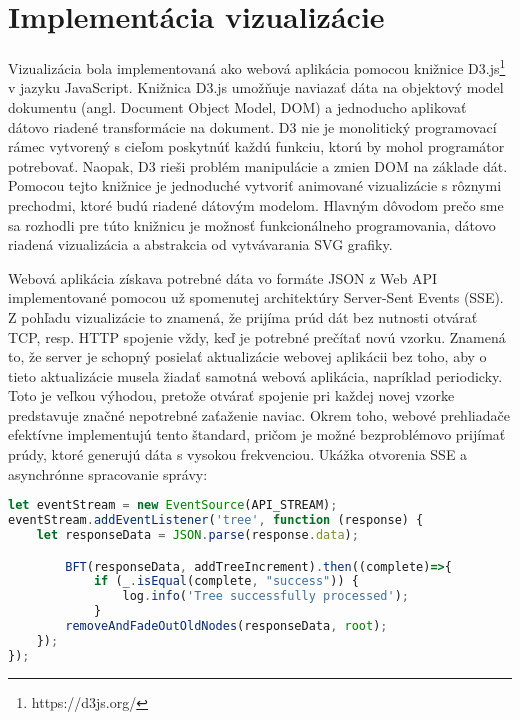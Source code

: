 \section{Implementácia vizualizácie}
\label{Implementácia vizualizácie}
Vizualizácia bola implementovaná ako webová aplikácia pomocou knižnice D3.js\footnote{https://d3js.org/} v jazyku JavaScript. Knižnica D3.js umožňuje naviazať dáta na objektový model dokumentu (angl. Document Object Model, DOM) a jednoducho aplikovať dátovo riadené transformácie na dokument. D3 nie je monolitický programovací rámec vytvorený s cieľom poskytnúť každú funkciu, ktorú by mohol programátor potrebovať. Naopak, D3 rieši problém manipulácie a zmien DOM na základe dát. Pomocou tejto knižnice je jednoduché vytvoriť animované vizualizácie s rôznymi prechodmi, ktoré budú riadené dátovým modelom. Hlavným dôvodom prečo sme sa rozhodli pre túto knižnicu je možnosť funkcionálneho programovania, dátovo riadená vizualizácia a abstrakcia od vytvávarania SVG grafiky.
\par
Webová aplikácia získava potrebné dáta vo formáte JSON z Web API implementované pomocou už spomenutej architektúry Server-Sent Events (SSE). Z pohľadu vizualizácie to znamená, že prijíma prúd dát bez nutnosti otvárať TCP, resp. HTTP spojenie vždy, keď je potrebné prečítať novú vzorku. Znamená to, že server je schopný posielať aktualizácie webovej aplikácii bez toho, aby o tieto aktualizácie musela žiadať samotná webová aplikácia, napríklad periodicky. Toto je veľkou výhodou, pretože otvárať spojenie pri každej novej vzorke predstavuje značné nepotrebné zaťaženie naviac. Okrem toho, webové prehliadače efektívne implementujú tento štandard, pričom je možné bezproblémovo prijímať prúdy, ktoré generujú dáta s vysokou frekvenciou. Ukážka otvorenia SSE a asynchrónne spracovanie správy:
\begin{lstlisting}[language=JavaScript]
let eventStream = new EventSource(API_STREAM);
eventStream.addEventListener('tree', function (response) {
    let responseData = JSON.parse(response.data);

        BFT(responseData, addTreeIncrement).then((complete)=>{
            if (_.isEqual(complete, "success")) {
                log.info('Tree successfully processed');
            }
        removeAndFadeOutOldNodes(responseData, root);
    });
});
\end{lstlisting}
